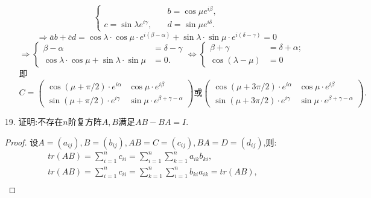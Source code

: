 \documentclass{article}
\begin{document}
\begin{enumerate}
\begin{enumerate}
\[\begin{cases}
                    &b=\cos\mu e^{i\beta},\\
                    c=\sin\lambda  e^{i\gamma},\quad
                    &d=\sin\mu e^{i\delta}.
                \end{cases}
            \]
            \[
                \Rightarrow
                \overline{a}b+\overline{c}d
                =\cos\lambda \cdot \cos\mu \cdot e^{i(\beta-\alpha)}
                +\sin\lambda \cdot \sin\mu \cdot e^{i(\delta-\gamma)}=0
            \]
            \[
                \Rightarrow
                \begin{cases}
                    \beta-\alpha&=\delta-\gamma\\
                    \cos\lambda \cdot \cos\mu+\sin\lambda \cdot \sin\mu&=0.
                \end{cases}
                \Longleftrightarrow 
                \begin{cases}
                    \beta+\gamma&=\delta+\alpha;\\
                    \cos(\lambda-\mu)&=0
                \end{cases}
            \]
            即
            \[
                C=
                \begin{pmatrix}
                    \cos(\mu+\pi/2)\cdot e^{i\alpha} & \cos\mu\cdot e^{i\beta}\\
                    \sin(\mu+\pi/2)\cdot e^{i\gamma} & \sin\mu\cdot e^{\beta+\gamma-\alpha}
                \end{pmatrix}
                \mbox{或}
                \begin{pmatrix}
                    \cos(\mu+3\pi/2)\cdot e^{i\alpha} & \cos\mu\cdot e^{i\beta}\\
                    \sin(\mu+3\pi/2)\cdot e^{i\gamma} & \sin\mu\cdot e^{\beta+\gamma-\alpha}
                \end{pmatrix}.
            \]
        \end{enumerate}
        \item [19.]证明:不存在$n$阶复方阵$A,B$满足$AB-BA=I$.
        \begin{proof}
            设$A=(a_{ij}),B=(b_{ij}),AB=C=(c_{ij}),BA=D=(d_{ij})$,则:
            \begin{align*}
                &tr(AB)=\displaystyle{\sum\limits_{i=1}^{n}c_{ii}}=\displaystyle{\sum\limits_{i=1}^{n} \sum\limits_{k=1}^{n} a_{ik}b_{ki}},\\
                &tr(AB)=\displaystyle{\sum\limits_{i=1}^{n}c_{ii}}=\displaystyle{\sum\limits_{k=1}^{n} \sum\limits_{i=1}^{n} b_{ki}a_{ik}}=tr(AB),\\

\end{align*}
\end{proof}
\end{enumerate}
\end{document}
